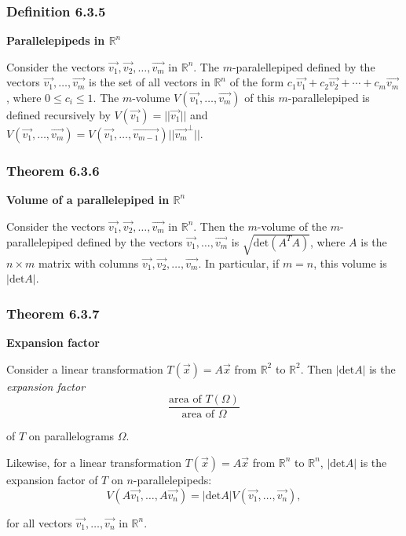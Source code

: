 \documentclass{report}
\begin{document}
\subsubsection*{Definition 6.3.5}
\par\noindent\textbf{Parallelepipeds in $\mathbb{R}^{n}$}
\par\noindent Consider the vectors $\vec{v_{1}},\vec{v_{2}},\ldots{},\vec{v_{m}}$ in $\mathbb{R}^{n}$. The $m$-paralellepiped defined by the vectors $\vec{v_{1}},\ldots{},\vec{v_{m}}$ is the set of all vectors in $\mathbb{R}^{n}$ of the form $c_{1}\vec{v_{1}}+c_{2}\vec{v_{2}}+\cdots{}+c_{m}\vec{v_{m}}$, where $0\le{}c_{i}\le{}1$. The $m$-volume $V(\vec{v_{1}},\ldots{},\vec{v_{m}})$ of this $m$-parallelepiped is defined recursively by $V(\vec{v_{1}})=||\vec{v_{1}}||$ and $V(\vec{v_{1}},\ldots{},\vec{v_{m}})=V(\vec{v_{1}},\ldots{},\vec{v_{m-1}})||\vec{v_{m}}^{\perp}||$.
\subsubsection*{Theorem 6.3.6}
\par\noindent\textbf{Volume of a parallelepiped in $\mathbb{R}^{n}$}
\par\noindent Consider the vectors $\vec{v_{1}},\vec{v_{2}},\ldots{},\vec{v_{m}}$ in $\mathbb{R}^{n}$. Then the $m$-volume of the $m$-parallelepiped defined by the vectors $\vec{v_{1}},\ldots{},\vec{v_{m}}$ is $\sqrt{\textrm{det}(A^{T}A)}$, where $A$ is the $n\times{}m$ matrix with columns $\vec{v_{1}},\vec{v_{2}},\ldots{},\vec{v_{m}}$. In particular, if $m=n$, this volume is $|\textrm{det}A|$.
\subsubsection*{Theorem 6.3.7}
\par\noindent\textbf{Expansion factor}
\par\noindent Consider a linear transformation $T(\vec{x})=A\vec{x}$ from $\mathbb{R}^{2}$ to $\mathbb{R}^{2}$. Then $|\textrm{det}A|$ is the \textit{expansion factor}
\[\frac{\textrm{area of }T(\Omega{})}{\textrm{area of }\Omega{}}\]
\par\noindent of $T$ on parallelograms $\Omega{}$.
\par\noindent Likewise, for a linear transformation $T(\vec{x})=A\vec{x}$ from $\mathbb{R}^{n}$ to $\mathbb{R}^{n}$, $|\textrm{det}A|$ is the expansion factor of $T$ on $n$-parallelepipeds:
\[V(A\vec{v_{1}},\ldots{},A\vec{v_{n}})=|\textrm{det}A|V(\vec{v_{1}},\ldots{},\vec{v_{n}}),\]
\par\noindent for all vectors $\vec{v_{1}},\ldots{},\vec{v_{n}}$ in $\mathbb{R}^{n}$.
\end{document}
